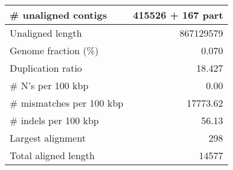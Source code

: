 \documentclass[12pt,a4paper]{article}
\begin{document}
\begin{table}[ht]
\begin{center}
\begin{tabular}{|l*{1}{|r}|}
\# unaligned contigs & 415526 + 167 part \\ \hline
Unaligned length & 867129579 \\ \hline
Genome fraction (\%) & 0.070 \\ \hline
Duplication ratio & 18.427 \\ \hline
\# N's per 100 kbp & 0.00 \\ \hline
\# mismatches per 100 kbp & 17773.62 \\ \hline
\# indels per 100 kbp & 56.13 \\ \hline
Largest alignment & 298 \\ \hline
Total aligned length & 14577 \\ \hline
\end{tabular}
\end{center}
\end{table}
\end{document}
